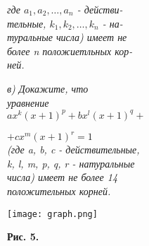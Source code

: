 \newpage
\thispagestyle{empty}
\vspace{0.1cm}
\noindent
\begin{minipage}[t]{0.31\textwidth}
\textit{где $a_1, a_2, \dots, a_n$ - действи- \\ тельные, $k_1, k_2, \dots, k_n$ - на- \\ туральные числа) имеет не \\ более n положиетльных кор- \\ ней. }

\qquad\textit{в) Докажите, что \\ уравнение \\ $ax^k(x+1)^p+bx^l(x+1)^q+$}

\hspace{2cm}
\textit{
    $+cx^m(x+1)^r=1$ \\
    (где a, b, c - действительные, \\
    k, l, m, p, q, r - натуральные \\
    числа) имеет не более 14 \\
    положительных корней.
}
\vspace{0.2cm}

\texttt{[image: graph.png]}

\vspace{0.1cm}
\textbf{Рис. 5.}
\end{minipage}
\hfill
